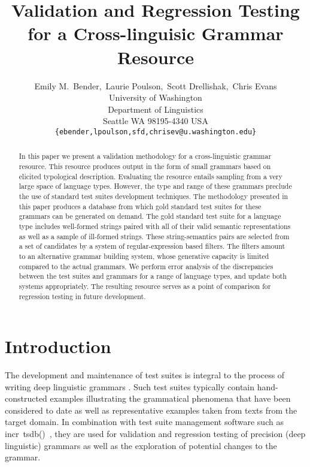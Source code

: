 \documentclass[11pt]{article}
\title{Validation and Regression Testing for a Cross-linguisic Grammar Resource}
\author{Emily M.~Bender,\  Laurie Poulson,\  Scott Drellishak,\ Chris Evans\\
University of Washington\\
Department of Linguistics\\
Seattle WA 98195-4340 USA\\
{\tt \{ebender,lpoulson,sfd,chrisev@u.washington.edu\}}}
\date{}
\newcommand{\itsdb}{\mbox{\sf \lbrack incr tsdb()\rbrack}}
\begin{document}
\maketitle
\begin{abstract}

In this paper we present a validation methodology for a
  cross-linguistic grammar resource.  This resource produces output in
  the form of small grammars based on elicited typological
  description.  Evaluating the resource entails sampling from a very
  large space of language types. However, the type and range of these
  grammars preclude the use of standard test suites development
  techniques.  The methodology presented in this paper produces a
  database from which gold standard test suites for these grammars can
  be generated on demand.  The gold standard test suite for a language
  type includes well-formed strings paired with all of their valid
  semantic representations as well as a sample of ill-formed strings.
  These string-semantics pairs are selected from a set of candidates
  by a system of regular-expression based filters.  The filters amount
  to an alternative grammar building system, whose generative capacity
  is limited compared to the actual grammars.  We perform error
  analysis of the discrepancies between the test suites and grammars
  for a range of language types, and update both systems
  appropriately.  The resulting resource serves as a point of
  comparison for regression testing in future development.

\end{abstract}


\section{Introduction}

The development and maintenance of test suites is integral to the
process of writing deep linguistic grammars
\cite{Oep:Fli:98,But:Kin:03}.  Such test suites typically contain
hand-constructed examples illustrating the grammatical phenomena that
have been considered to date as well as representative examples taken
from texts from the target domain.  In combination with test suite
management software such as \itsdb\ \cite{Oepen:02}, they are used for
validation and regression testing of precision (deep linguistic) grammars as well as the
exploration of potential changes to the grammar.  
\end{document}
